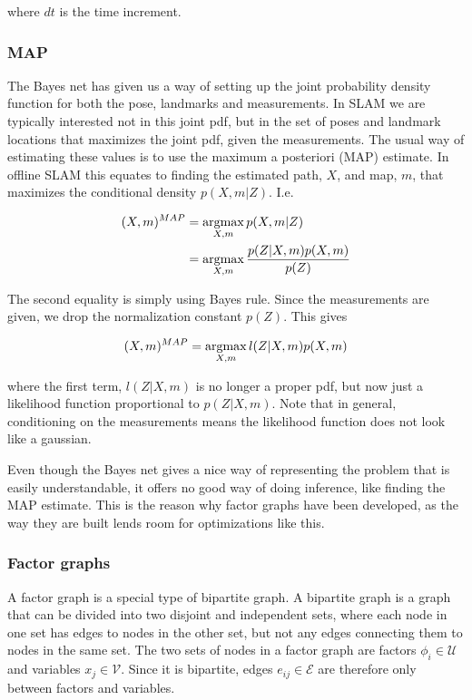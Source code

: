 where $dt$ is the time increment.

\subsubsection{MAP}

The Bayes net has given us a way of setting up the joint probability density function for both the pose, landmarks and measurements. In SLAM we are typically interested not in this joint pdf, but in the set of poses and landmark locations that maximizes the joint pdf, given the measurements. The usual way of estimating these values is to use the maximum a posteriori (MAP) estimate. In offline SLAM this equates to finding the estimated path, $X$, and map, $m$, that maximizes the conditional density $p(X,m|Z)$. I.e.

\begin{align}
    (X,m)^{MAP} &= \operatorname*{argmax}_{X,m}p(X,m|Z) \\
    &= \operatorname*{argmax}_{X,m}\frac{p(Z|X,m)p(X,m)}{p(Z)}
\end{align}

The second equality is simply using Bayes rule. Since the measurements are given, we drop the normalization constant $p(Z)$. This gives

\begin{equation}
    (X,m)^{MAP} = \operatorname*{argmax}_{X,m}l(Z|X,m)p(X,m)
\end{equation}

where the first term, $l(Z|X,m)$ is no longer a proper pdf, but now just a likelihood function proportional to $p(Z|X,m)$. Note that in general, conditioning on the measurements means the likelihood function does not look like a gaussian. 

Even though the Bayes net gives a nice way of representing the problem that is easily understandable, it offers no good way of doing inference, like finding the MAP estimate. This is the reason why factor graphs have been developed, as the way they are built lends room for optimizations like this.

\subsubsection{Factor graphs}

A factor graph is a special type of bipartite graph. A bipartite graph is a graph that can be divided into two disjoint and independent sets, where each node in one set has edges to nodes in the other set, but not any edges connecting them to nodes in the same set. The two sets of nodes in a factor graph are factors $\phi_i\in \mathcal{U}$ and variables $x_j\in \mathcal{V}$. Since it is bipartite, edges $e_{ij}\in \mathcal{E}$ are therefore only between factors and variables. 

